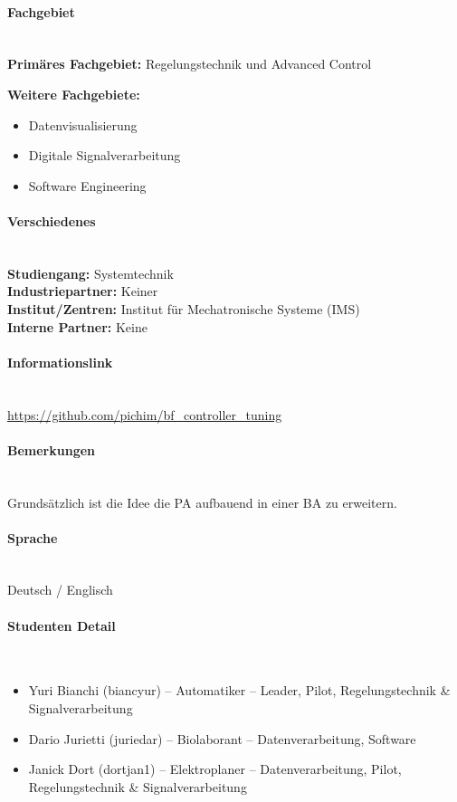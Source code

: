 \documentclass[a4paper,11pt]{scrartcl}
\begin{document}
\paragraph{Fachgebiet}~\\
\textbf{Primäres Fachgebiet:} Regelungstechnik und Advanced Control

\textbf{Weitere Fachgebiete:}
\begin{itemize}
	\item Datenvisualisierung
	\item Digitale Signalverarbeitung
	\item Software Engineering
\end{itemize}

\paragraph{Verschiedenes}~\\
\textbf{Studiengang:} Systemtechnik\\
\textbf{Industriepartner:} Keiner\\
\textbf{Institut/Zentren:} Institut für Mechatronische Systeme (IMS)\\
\textbf{Interne Partner:} Keine

\paragraph{Informationslink}~\\
\url{https://github.com/pichim/bf_controller_tuning}

\paragraph{Bemerkungen}~\\
Grundsätzlich ist die Idee die PA aufbauend in einer BA zu erweitern.

\paragraph{Sprache}~\\
Deutsch / Englisch

\paragraph{Studenten Detail}~\\
\begin{itemize}
	\item Yuri Bianchi (biancyur) -- Automatiker -- Leader, Pilot, Regelungstechnik \& Signalverarbeitung
	\item Dario Jurietti (juriedar) -- Biolaborant -- Datenverarbeitung, Software
	\item Janick Dort (dortjan1) -- Elektroplaner -- Datenverarbeitung, Pilot, Regelungstechnik \& Signalverarbeitung
\end{itemize}
\end{document}
